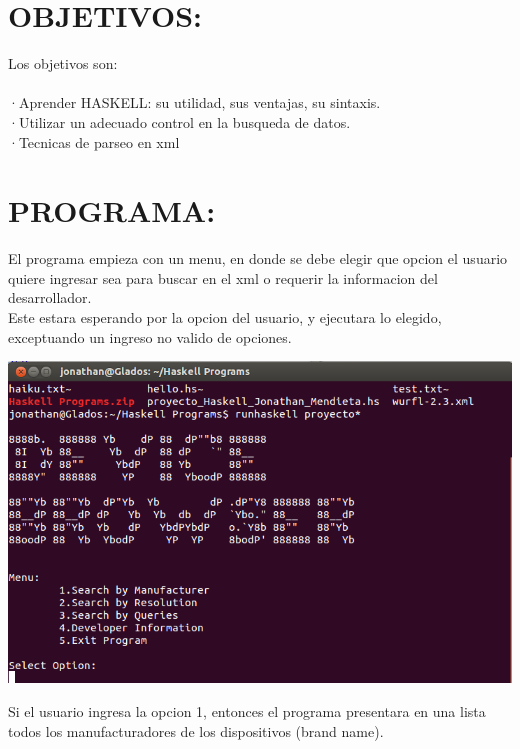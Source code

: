 \documentclass[11pt]{article} %
\begin{document}
\section{OBJETIVOS:}
Los objetivos son:\\\\
·Aprender HASKELL: su utilidad, sus ventajas, su sintaxis.\\
·Utilizar un adecuado control en la busqueda de datos.\\
·Tecnicas de parseo en xml\\

\section{PROGRAMA:}
El programa empieza con un menu, en donde se debe elegir que opcion el usuario quiere ingresar sea para buscar en el xml o requerir la informacion del desarrollador.\\
Este estara esperando por la opcion del usuario, y ejecutara lo elegido, exceptuando un ingreso no valido de opciones.\\
\begin{center}
\includegraphics[scale=0.4]{screens/haskell1.png}
\end{center}
Si el usuario ingresa la opcion 1, entonces el programa presentara en una lista todos los manufacturadores de los dispositivos (brand name).\\
\end{document}
